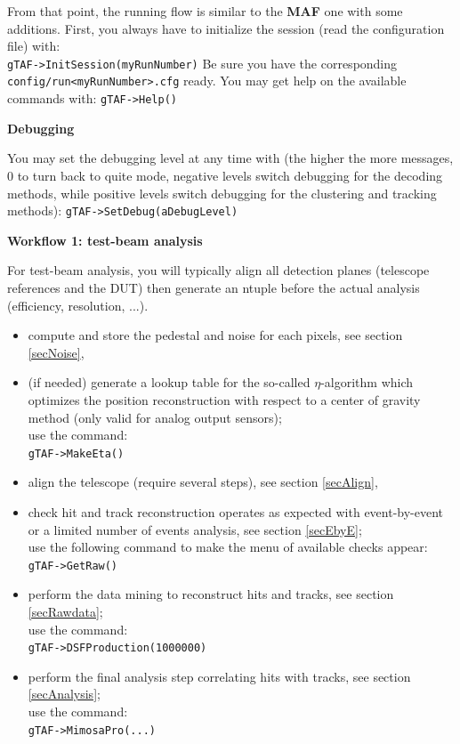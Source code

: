 \documentclass[a4paper, 12pt, twoside]{article}
\newcommand{\MAF}{{\bf MAF }}
\begin{document}
\noindent
From that point, the running flow is similar to the \MAF  one with some additions. First, you always have to initialize the session (read the configuration file) with:\\
{\tt gTAF->InitSession(myRunNumber)}
\noindent
Be sure you have the corresponding {\tt config/run<myRunNumber>.cfg} ready.
\noindent
You may get help on the available commands with:
{\tt gTAF->Help()}\\


\vspace{0.8 cm}

\noindent
{\bf Debugging}

\noindent
You may set the debugging level at any time with (the higher the more messages, 0 to turn back to quite mode, negative levels switch debugging for the decoding methods, while positive levels switch debugging for the clustering and tracking methods):
{\tt gTAF->SetDebug(aDebugLevel)}\\


\vspace{0.8 cm}

\noindent
{\bf Workflow 1: test-beam analysis}

\noindent
For test-beam analysis, you will typically align all detection planes (telescope references and the DUT) then generate an ntuple before the actual analysis (efficiency, resolution, ...).
\begin{itemize}
\item compute and store the pedestal and noise for each pixels, see section \ref{secNoise},
\item (if needed) generate a lookup table for the so-called $\eta$-algorithm which optimizes the position reconstruction with respect to a center of gravity method (only valid for analog output sensors);\\ use the command:\\
{\tt gTAF->MakeEta()}
\item align the telescope (require several steps), see section \ref{secAlign},
\item check hit and track reconstruction operates as expected with event-by-event or a limited number of events analysis, see section \ref{secEbyE};\\ use the following command to make the menu of available checks appear:\\
{\tt gTAF->GetRaw()}
\item perform the data mining to reconstruct hits and tracks, see section \ref{secRawdata};\\ use the command:\\
{\tt gTAF->DSFProduction(1000000)}
\item perform the final analysis step correlating hits with tracks, see section \ref{secAnalysis};\\ use the command:\\
{\tt gTAF->MimosaPro(...)}
\end{itemize}
\end{document}
